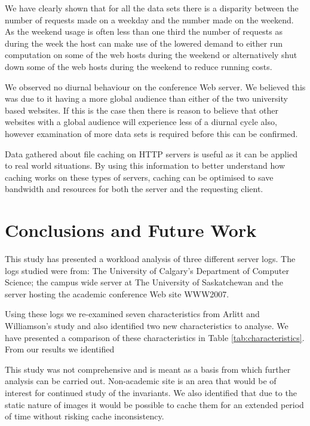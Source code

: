 \documentclass[10pt,conference]{IEEEtran}
\begin{document}
We have clearly shown that for all the data sets there is a disparity between the number of requests made on a weekday and the number made on the weekend. As the weekend usage is often less than one third the number of requests as during the week the host can make use of the lowered demand to either run computation on some of the web hosts during the weekend or alternatively shut down some of the web hosts during the weekend to reduce running costs.

We observed no diurnal behaviour on the conference Web server. We believed this was due to it having a more global audience than either of the two university based websites. If this is the case then there is reason to believe that other websites with a global audience will experience less of a diurnal cycle also, however examination of more data sets is required before this can be confirmed.

Data gathered about file caching on HTTP servers is useful as it can be applied to real world situations. By using this information to better understand how caching works on these types of servers, caching can be optimised to save bandwidth and resources for both the server and the requesting client.

\section{Conclusions and Future Work}\label{conclusions}
This study has presented a workload analysis of three different server logs. The logs studied were from: The University of Calgary's Department of Computer Science; the campus wide server at The University of Saskatchewan and the server hosting the  academic conference Web site WWW2007.

Using these logs we re-examined seven characteristics from Arlitt and Williamson's study \cite{keynote} and also identified two new characteristics to analyse. We have presented a comparison of these characteristics in Table \ref{tab:characteristics}. From our results we identified

This study was not comprehensive and is meant as a basis from which further analysis can be carried out. Non-academic site is an area that would be of interest for continued study of the invariants.
We also identified that due to the static nature of images it would be possible to cache them for an extended period of time without risking cache inconsistency.

\printbibliography
\end{document}
